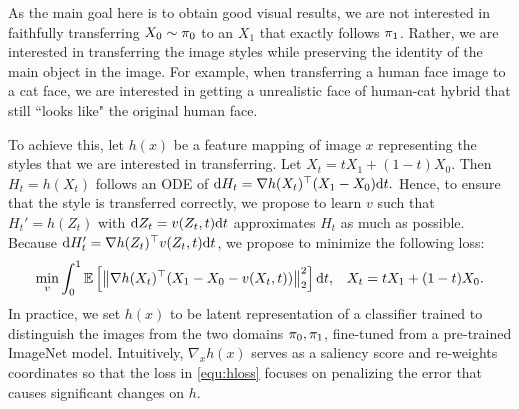 As the main goal here is to obtain good visual results,  
we are not interested in faithfully transferring $X_0\sim {\pi}_0$  
to an $X_1$ that exactly follows ${\pi}_1$. 
Rather, we are interested in 
transferring the image styles while preserving the identity of the main object in the image. For example, 
when transferring a human face image to a cat face, 
we are interested in getting a unrealistic face of human-cat hybrid that still ``looks like" the original human face.

To achieve this, 
let $h(x)$ be a feature mapping of image $x$ representing the styles that we are interested in transferring. 
Let $X_t = t X_1 + (1-t) X_0$. Then $H_t = h(X_t)$ follows an ODE of $\mathrm{d} H_t = \nabla h(X_t)^\top (X_1-X_0)\mathrm{d}t .$ Hence, to ensure that the style is transferred correctly, 
we propose to %
learn $v$ such that $H_t' = h(Z_t)$ with $\mathrm{d} Z_t  = v(Z_t,t)\mathrm{d}t $ approximates $H_t$ as much as possible. 
Because $\mathrm{d} H_t' = \nabla h(Z_t) ^\top v(Z_t, t)\mathrm{d}t$, we propose to minimize the following loss: 
\begin{align}\label{equ:hloss}
    \min_v \int_0^1\mathbb{E} \left[ \left\lVert \nabla h(X_t)^\top (X_1 - X_0 - v (X_t, t)) \right\rVert_2^2 \right ] \mathrm{d}t , && X_t = t X_1 + (1 - t) X_0. 
\end{align}
In practice, we set $h(x)$ to be latent representation of a classifier trained 
to distinguish the images from the two domains ${\pi}_0,{\pi}_1$, fine-tuned from a pre-trained ImageNet \citep{tan2019efficientnet} model. %
Intuitively, $\nabla_x h(x)$ serves as a saliency score and re-weights coordinates so that the loss in \eqref{equ:hloss} focuses on penalizing the error that causes significant changes on $h$. 





